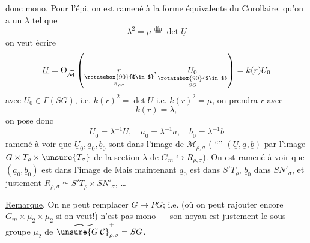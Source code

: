 donc mono. Pour l'épi, on est ramené à la forme équivalente du Corollaire.  qu'on a un $\lambda$ tel que
\[
\lambda^2=\mu\overset{\mathrm{dfn}}{=}\det\underline U
\]
on veut écrire
\[
\underline U=\Theta_{\widetilde{\mathcal M}}
\left(\underset{\underset{R_{\rho\sigma}}{\rotatebox{90}{$\in$}}}{r},
\underset{\underset{SG}{\rotatebox{90}{$\in$}}}{U_0}\right)
=k(r)U_0
\]
avec $U_0\in\Gamma(SG)$, i.e. $k(r)^2=\det\underline U$ i.e. $k(r)^2=\mu$,
on prendra $r$ avec 
\[
k(r)=\lambda,
\]
 on pose donc
\[
\underline U_0=\lambda^{-1}U,\quad
\underline a_0=\lambda^{-1}\underline a,\quad
\underline b_0=\lambda^{-1}b
\]
  ramené à voir que $\underline U_0,\underline a_0,\underline b_0$ sont dans l'image de $\mathcal M_{\rho,\sigma}$ ( ``'' $(\underline U,\underline a,\underline b)$ par l'image  $G\times T_\rho\times\unsure{T_\sigma}$ de la section $\lambda$ de $G_m\hookrightarrow R_{\rho,\sigma}$). On est ramené à voir que $(\underline a_0,\underline b_0)$ est dans l'image de
Mais maintenant $\underline a_0$ est dans $S'T_\rho$, $\underline b_0$ dans $SN'_\sigma$, et justement $R_{\rho,\sigma}\simeq S'T_\rho\times SN'_\sigma$, \ldots

\uline{Remarque}. On ne peut remplacer $G\mapsto PG$;
i.e.
(où on peut rajouter encore $G_m\times\mu_2\times\mu_2$ si on veut!) n'est \uline{pas} mono --- son noyau est justement le sous-groupe $\mu_2$ de $\widetilde{\unsure{G|\mathcal C}}_{\rho,\sigma}^{+}=SG$.



